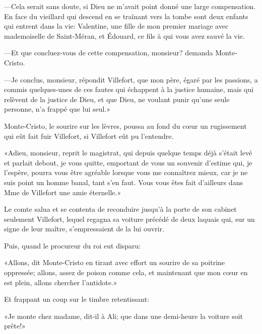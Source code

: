 —Cela serait sans doute, si Dieu ne m'avait point donné une large compensation. En face du vieillard qui descend en se traînant vers la tombe sont deux enfants qui entrent dans la vie: Valentine, une fille de mon premier mariage avec mademoiselle de Saint-Méran, et Édouard, ce fils à qui vous avez sauvé la vie. 

—Et que concluez-vous de cette compensation, monsieur? demanda Monte-Cristo. 

—Je conclus, monsieur, répondit Villefort, que mon père, égaré par les passions, a commis quelques-unes de ces fautes qui échappent à la justice humaine, mais qui relèvent de la justice de Dieu, et que Dieu, ne voulant punir qu'une seule personne, n'a frappé que lui seul.» 

Monte-Cristo, le sourire sur les lèvres, poussa au fond du cœur un rugissement qui eût fait fuir Villefort, si Villefort eût pu l'entendre. 

«Adieu, monsieur, reprit le magistrat, qui depuis quelque temps déjà s'était levé et parlait debout, je vous quitte, emportant de vous un souvenir d'estime qui, je l'espère, pourra vous être agréable lorsque vous me connaîtrez mieux, car je ne suis point un homme banal, tant s'en faut. Vous vous êtes fait d'ailleurs dans Mme de Villefort une amie éternelle.» 

Le comte salua et se contenta de reconduire jusqu'à la porte de son cabinet seulement Villefort, lequel regagna sa voiture précédé de deux laquais qui, sur un signe de leur maître, s'empressaient de la lui ouvrir.  

Puis, quand le procureur du roi eut disparu: 

«Allons, dit Monte-Cristo en tirant avec effort un sourire de sa poitrine oppressée; allons, assez de poison comme cela, et maintenant que mon cœur en est plein, allons chercher l'antidote.» 

Et frappant un coup sur le timbre retentissant: 

«Je monte chez madame, dit-il à Ali; que dans une demi-heure la voiture soit prête!» 